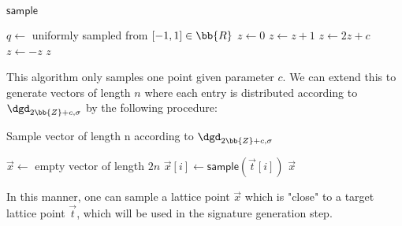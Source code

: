 \begin{algorithm}[H]
\caption{$\mathsf{sample}$}
\begin{algorithmic}[1]
    \State $q \gets$ uniformly sampled from $[-1, 1] \in \bb{R}$
    \State $z \gets 0$
    \State $z \gets z + 1$
    \Else
    \State $z \gets 2z + c$
    \State $z \gets -z$
    \EndIf
    \EndIf
    \EndWhile
    \State \Return $z$
\end{algorithmic}
\end{algorithm}

This algorithm only samples one point given parameter $c$.
We can extend this to generate vectors of length $n$ where each entry is distributed according to $\dgd_{2\bb{Z}+c, \sigma}$ by the following procedure:
\begin{algorithm}[H]
\caption{Sample vector of length n according to $\dgd_{2\bb{Z}+c, \sigma}$}
\begin{algorithmic}[1]
    \State $\vec{x} \gets$ empty vector of length $2n$
    \State $\vec{x}[i] \gets \mathsf{sample}(\vec{t}[i])$
    \EndFor
    \Return $\vec{x}$
\end{algorithmic}
\end{algorithm}

In this manner, one can sample a lattice point $\vec{x}$ which is "close" to a target lattice point $\vec{t}$, which will be used in the signature generation step.

